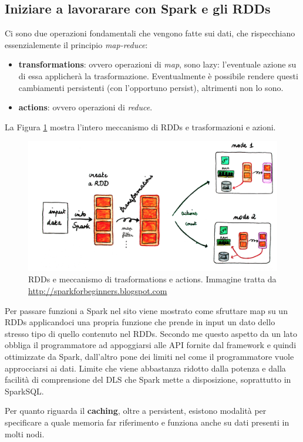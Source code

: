 \documentclass[12pt,italian]{article}
\begin{document}
\subsection{Iniziare a lavorarare con Spark e gli RDDs}
Ci sono due operazioni fondamentali che vengono fatte sui dati, che rispecchiano essenzialemente il principio \textit{map-reduce}:
\begin{itemize}
	\item \textbf{transformations}: ovvero operazioni di \textit{map}, sono lazy: l'eventuale azione su di essa applicherà la trasformazione. Eventualmente è possibile rendere questi cambiamenti persistenti (con l'opportuno persist), altrimenti non lo sono.
	\item \textbf{actions}\label{sec:actions}: ovvero operazioni di \textit{reduce}.
\end{itemize}
La Figura \ref{fig:RDDs} mostra l'intero meccanismo di RDDs e trasformazioni e azioni.
\begin{figure}
	\centering 
	\includegraphics[width=1\linewidth]{img/rdds.png}
	\caption{RDDs e meccanismo di trasformations e actions. Immagine tratta da \url{http://sparkforbeginners.blogspot.com}}
	\label{fig:RDDs}
\end{figure}
\par Per passare funzioni a Spark nel sito viene mostrato come sfruttare map su un RDDs applicandoci una propria funzione che prende in input un dato dello stresso tipo di quello contenuto nel RDDs. Secondo me questo aspetto da un lato obbliga il programmatore ad appoggiarsi alle API fornite dal framework e quindi ottimizzate da Spark, dall'altro pone dei limiti nel come il programmatore vuole approcciarsi ai dati. Limite che viene abbastanza ridotto dalla potenza e dalla facilità di comprensione del DLS che Spark mette a disposizione, soprattutto in SparkSQL.
\par Per quanto riguarda il \textbf{caching}, oltre a persistent, esistono modalità per specificare a quale memoria far riferimento e funziona anche su dati presenti in molti nodi.
\end{document}
